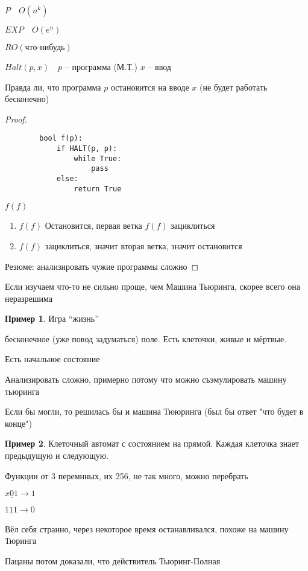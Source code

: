 \documentclass{book}
\theoremstyle{definition}
\newtheorem*{example}{Пример}
\begin{document}
$P\quad O\left( n^k \right) $

$EXP\quad O\left(e^n  \right) $

$R O\left( \text{что-нибудь} \right) $

$Halt\left( p, x \right) \quad p$ -- программа (М.Т.) $x$ -- ввод

Правда ли, что программа  $p$ остановится на вводе  $x$ (не будет работать бесконечно)

 \begin{proof}
    \begin{lstlisting}
        bool f(p):
            if HALT(p, p):
                while True:
                    pass
            else:
                return True
    \end{lstlisting}

    $f(f)$

     \begin{enumerate}
         \item $f(f)$ Остановится, первая ветка  $f(f)$ зациклиться
         \item  $f(f)$ зациклиться, значит вторая ветка, значит остановится
    \end{enumerate}

    Резюме: анализировать чужие программы сложно
\end{proof}

Если изучаем что-то не сильно проще, чем Машина Тьюринга, скорее всего она неразрешима

\begin{example}
    Игра ``жизнь''

    бесконечное (уже повод задуматься) поле. Есть клеточки, живые и мёртвые.

    Есть начальное состояние

    Анализировать сложно, примерно потому что можно съэмулировать машину тьюринга

    Если бы могли, то решилась бы и машина Тююринга (был бы ответ "что будет в конце")
\end{example}

\begin{example}
    Клеточный автомат с состоянием на прямой. Каждая клеточка знает предыдущую и следующую.

    Функции от 3 перемнных, их 256, не так много, можно перебрать

    $x \underline 0 1\to  1$

    $1 \underline 1 1 \to  0$

    Вёл себя странно, через некоторое время останавливался, похоже на машину Тюринга

    Пацаны потом доказали, что действитель Тьюринг-Полная
\end{example}
\end{document}
